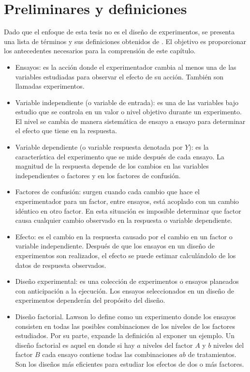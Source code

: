 \section{Preliminares y definiciones}

Dado que el enfoque de esta tesis no es el diseño de experimentos, se presenta una lista de términos y sus definiciones obtenidos de \cite{lawson2015design}. El objetivo es proporcionar los antecedentes necesarios para la comprensión de este capítulo. 

\begin{itemize}
	\item Ensayos: es la acción donde el experimentador cambia al menos una de las variables estudiadas para observar el efecto de su acción. También son llamadas experimentos. 
	
	\item Variable independiente (o variable de entrada): es una de las variables bajo estudio que se controla en un valor o nivel objetivo durante un experimento. El nivel se cambia de manera sistemática de ensayo a ensayo para determinar el efecto que tiene en la respuesta. 
	
	\item Variable dependiente (o variable respuesta denotada por $Y$): es la característica del experimento que se mide después de cada ensayo. La magnitud de la respuesta depende de los cambios en las variables independientes o factores y en los factores de confusión. 
	
	\item Factores de confusión: surgen cuando cada cambio que hace el experimentador para un factor, entre ensayos, está acoplado con un cambio idéntico en otro factor. En esta situación es imposible determinar que factor causa cualquier cambio observado en la respuesta o variable dependiente. 
	
	\item Efecto: es el cambio en la respuesta causado por el cambio en un factor o variable independiente. Después de que los ensayos en un diseño de experimentos son realizados, el efecto se puede estimar calculándolo de los datos de respuesta observados. 
	
	\item Diseño experimental: es una colección de experimentos o ensayos planeados con anticipación a la ejecución. Los ensayos seleccionados en un diseño de experimentos dependerán del propósito del diseño. 
	
	\item Diseño factorial. Lawson lo define como un experimento donde los ensayos consisten en todas las posibles combinaciones de los niveles de los factores estudiados. Por su parte, \cite{montgomery2017design} expande la definición al exponer un ejemplo. Un diseño factorial es aquel en donde si hay $a$ niveles del factor $A$ y $b$ niveles del factor $B$ cada ensayo contiene todas las combinaciones $ab$ de tratamientos. Son los diseños más eficientes para estudiar los efectos de dos o más factores. 
	

\end{itemize}
